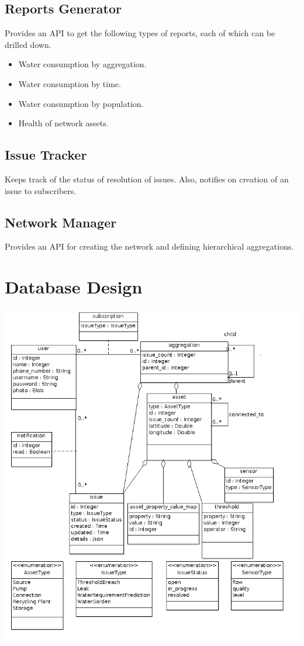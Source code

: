 \documentclass[12pt]{article}
\begin{document}
\subsection*{Reports Generator}
Provides an API to get the following types of reports, each of which can be drilled down.
\begin{itemize}
\item Water consumption by aggregation.
\item Water consumption by time.
\item Water consumption by population.
\item Health of network assets.
\end{itemize}
\subsection*{Issue Tracker}
Keeps track of the status of resolution of issues. Also, notifies on creation of an issue to subscribers.
\subsection*{Network Manager}
Provides an API for creating the network and defining hierarchical aggregations.

\section*{Database Design}
\includegraphics[scale=0.6]{DBDesign.png}
\end{document}
